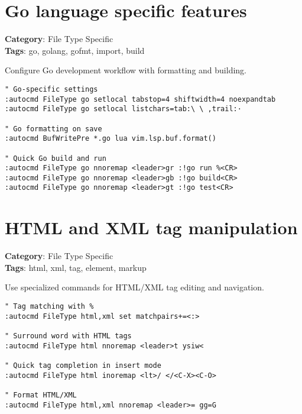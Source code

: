 {{{{{\section{Go language specific features}

\textbf{Category}: File Type Specific\\ \textbf{Tags}: go, golang, gofmt, import, build
\vspace{0.5cm}

Configure Go development workflow with formatting and building.

\begin{Exa*}{}
\begin{Verbatim}[fontsize=\footnotesize, breaklines, breakanywhere]
" Go-specific settings
:autocmd FileType go setlocal tabstop=4 shiftwidth=4 noexpandtab
:autocmd FileType go setlocal listchars=tab:\ \ ,trail:·

" Go formatting on save
:autocmd BufWritePre *.go lua vim.lsp.buf.format()

" Quick Go build and run
:autocmd FileType go nnoremap <leader>gr :!go run %<CR>
:autocmd FileType go nnoremap <leader>gb :!go build<CR>
:autocmd FileType go nnoremap <leader>gt :!go test<CR>
\end{Verbatim}
\end{Exa*}

\section{HTML and XML tag manipulation}

\textbf{Category}: File Type Specific\\ \textbf{Tags}: html, xml, tag, element, markup
\vspace{0.5cm}

Use specialized commands for HTML/XML tag editing and navigation.

\begin{Exa*}{}
\begin{Verbatim}[fontsize=\footnotesize, breaklines, breakanywhere]
" Tag matching with %
:autocmd FileType html,xml set matchpairs+=<:>

" Surround word with HTML tags
:autocmd FileType html nnoremap <leader>t ysiw<

" Quick tag completion in insert mode
:autocmd FileType html inoremap <lt>/ </<C-X><C-O>

" Format HTML/XML
:autocmd FileType html,xml nnoremap <leader>= gg=G
\end{Verbatim}
\end{Exa*}

}}}}}
